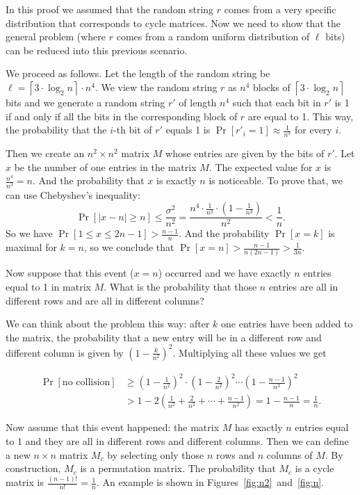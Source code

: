 \vspace{5mm}

In this proof we assumed that the random string $r$ comes from a very specific distribution
that corresponds to cycle matrices.
Now we need to show that the general problem (where $r$ comes from a
random uniform distribution of $\ell$ bits) can be reduced into this previous scenario.

We proceed as follows.
Let the length of the random string be
$\ell=\left\lceil 3\cdot \log_2 n\right\rceil \cdot n^4$.
We view the random string $r$ as $n^4$ blocks of $\left\lceil 3\cdot \log_2 n\right\rceil$
bits and we generate a random string $r'$ of length $n^4$ such that each bit in $r'$
is 1 if and only if all the bits in the corresponding block of $r$ are equal to 1.
This way, the probability that the $i$-th bit of $r'$ equals 1 is $\Pr[r'_i=1]\approx\frac{1}{n^3}$ for every $i$.

Then we create an $n^2\times n^2$ matrix $M$ whose entries are given by the bits of $r'$.
Let $x$ be the number of one entries in the matrix $M$.
The expected value for $x$ is $\frac{n^4}{n^3}=n$.
And the probability that $x$ is exactly $n$ is noticeable. To prove that, we can use
Chebyshev's inequality:
$$\Pr[|x-n|\geq n]\leq\frac{\sigma^2}{n^2}=
\frac{n^4\cdot \frac{1}{n^3}\cdot\left(1-\frac{1}{n^3}\right)}{n^2}<\frac{1}{n}.$$
So we have $\Pr[1\leq x\leq 2n-1]>\frac{n-1}{n}$.
And the probability $\Pr[x=k]$ is maximal for $k=n$, so we conclude that
$\Pr[x=n]>\frac{n-1}{n(2n-1)}>\frac{1}{3n}$.

Now suppose that this event ($x=n$) occurred and we have exactly $n$ entries equal to 1
in matrix $M$. What is the probability that those $n$ entries are all in different rows
and are all in different columns?

We can think about the problem this way: after $k$ one entries have been added to the matrix,
the probability that a new entry will be in a different row and different column is given by
$\left(1-\frac{k}{n^2}\right)^2$. Multiplying all these values we get

\begin{align*}
\Pr[\text{no collision}] &\geq \left(1-\frac{1}{n^2}\right)^2 \cdot \left(1-\frac{2}{n^2}\right)^2
\cdots \left(1-\frac{n-1}{n^2}\right)^2 \\
& > 1 - 2\left(\frac{1}{n^2} + \frac{2}{n^2} +\cdots + \frac{n-1}{n^2}\right)
= 1 - \frac{n-1}{n} = \frac{1}{n}.
\end{align*}

Now assume that this event happened: the matrix $M$ has exactly $n$ entries equal to 1
and they are all in different rows and different columns.
Then we can define a new $n\times n$ matrix $M_c$ by selecting only those $n$ rows
and $n$ columns of $M$. By construction, $M_c$ is a permutation matrix.
The probability that $M_c$ is a cycle matrix is $\frac{(n-1)!}{n!}=\frac{1}{n}$.
An example is shown in Figures~\ref{fig:n2}~and~\ref{fig:n}.

